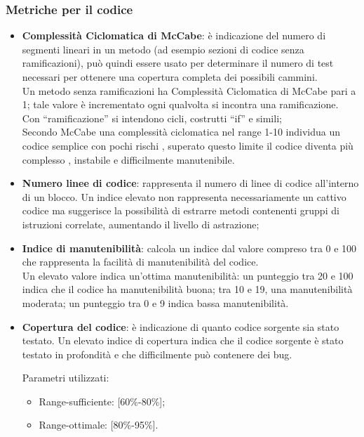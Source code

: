 \subsubsection{Metriche per il codice}
\begin{itemize}
\item \textbf{Complessità Ciclomatica di McCabe}: è indicazione del numero di segmenti lineari in un metodo (ad esempio sezioni di codice senza ramificazioni), può quindi essere usato per determinare il numero di test necessari per ottenere una copertura completa dei possibili cammini.  \\
Un metodo senza ramificazioni ha Complessità Ciclomatica di McCabe pari a 1; tale valore è incrementato ogni qualvolta si incontra una ramificazione.  \\
Con “ramificazione” si intendono cicli, costrutti “if” e simili;\\
Secondo McCabe una complessità ciclomatica nel range 1-10 individua un codice semplice con pochi rischi , superato questo limite il codice diventa più complesso , instabile e difficilmente manutenibile.

\item \textbf{Numero linee di codice}: rappresenta il numero di linee di codice all'interno di un blocco. 
Un indice elevato non rappresenta necessariamente un cattivo codice ma suggerisce la possibilità di estrarre metodi contenenti gruppi di istruzioni correlate, aumentando il livello di astrazione;

\item \textbf{Indice di manutenibilità}: calcola un indice dal valore compreso tra 0 e 100 che rappresenta la facilità di manutenibilità del codice.  \\
Un elevato valore indica un'ottima manutenibilità: un punteggio tra 20 e 100 indica che il codice ha manutenibilità buona; tra 10 e 19, una manutenibilità moderata; un punteggio tra 0 e 9 indica bassa manutenibilità.

\item \textbf{Copertura del codice}: è indicazione di quanto codice sorgente sia stato testato. Un elevato indice di copertura indica che il codice sorgente è stato testato in profondità e che difficilmente può contenere dei bug.

Parametri utilizzati:
\begin{itemize}
\item Range-sufficiente: [60\%-80\%];
\item Range-ottimale: [80\%-95\%].
\end{itemize}
\end{itemize}
